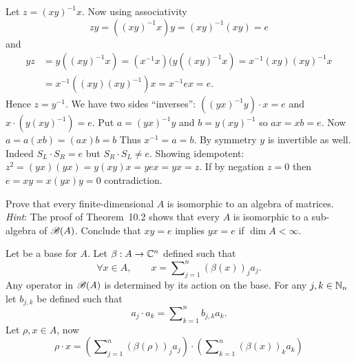 \begin{enumerate}
\begin{itemize}
    Let \(z = (xy)^{-1} x\). Now using associativity
    \begin{equation*}
      zy = ((xy)^{-1} x)y = (xy)^{-1}(xy) = e
    \end{equation*}
    and 
    \begin{align*}
      yz &= y((xy)^{-1} x) = (x^{-1} x)(y((xy)^{-1} x) = x^{-1}(xy)(xy)^{-1} x \\
         &= x^{-1}((xy)(xy)^{-1})x = x^{-1}ex = e.
    \end{align*}
    Hence \(z = y^{-1}\).
    We have two sides ``inverses'':
    \(((yx)^{-1}y)\cdot x = e\)
    and
    \(x\cdot(y(xy)^{-1}) = e\).
    Put \(a = (yx)^{-1}y\) and \(b = y(xy)^{-1}\)
    so \(ax = xb = e\). Now
    \(a = a(xb) = (ax)b = b\)
    Thus \(x^{-1} = a = b\).
    By symmetry $y$ is invertible as well.
    Indeed \(S_L\cdot S_R = e\) but \(S_R\cdot S_L \neq e\).
    Showing idempotent: \(z^2 = (yx)(yx) = y(xy)x = yex = yx = z\).
    If by negation \(z=0\) then \(e = xy = x(yx)y = 0\) contradiction.
\end{itemize}

\begin{excopy}
Prove that every finite-dimensional $A$ is isomorphic to an algebra of matrices.
\emph{Hint}:
The proof of Theorem~10.2 shows that every $A$ is isomorphic to
a sub-algebra of \(\mathscr{B}(A)\).
Conclude that \(xy = e\) implies \(yx = e\) if \(\dim A < \infty\).
\end{excopy}

Let  be a base for $A$.
Let \(\beta: A \to \mathbb{C}^n\) defined such that
\begin{equation*}
 \forall x\in A, \qquad
 x = \sum\nolimits_{j=1}^n \left(\beta(x)\right)_j a_j.
\end{equation*}
Any operator in \(\mathscr{B}(A)\) is determined by its action on the base.
For any \(j,k\in\mathbb{N}_n\) let \(b_{j,k}\) be defined such that
\begin{equation*}
a_j\cdot a_k = \sum\nolimits_{k=1}^n b_{j,k} a_k.
\end{equation*}
Let \(\rho,x \in A\), now
\begin{equation*}
\rho\cdot x =
  \left(\sum\nolimits_{j=1}^n \left(\beta(\rho)\right)_j a_j\right)
  \cdot
  \left(\sum\nolimits_{k=1}^n \left(\beta(x)\right)_k a_k\right)
\end{equation*}
\unfinished


\end{enumerate}
